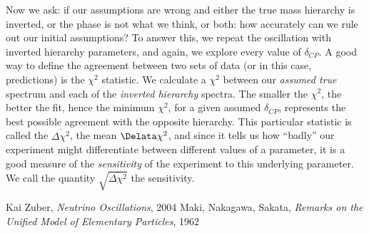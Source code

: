 \documentclass[10pt, a4paper]{article}
\begin{document}
Now we ask: if our assumptions are wrong and either the true mass hierarchy is
inverted, or the phase is not what we think, or both: how accurately can we
rule out our initial assumptions? To answer this, we repeat the oscillation
with inverted hierarchy parameters, and again, we explore every value of
$\delta_{CP}$. A good way to define the agreement between two sets of data (or
in this case, predictions) is the $\chi^2$ statistic. We calculate a $\chi^2$
between our \emph{assumed true} spectrum and each of the \emph{inverted
hierarchy} spectra. The smaller the $\chi^2$, the better the fit, hence the
minimum $\chi^2$, for a given assumed $\delta_{CP}$, represents the best
possible agreement with the opposite hierarchy. This particular statistic is
called the $\overline{\Delta\chi^2}$, the mean $\Delata\chi^2$, and since it tells
us how ``badly'' our experiment might differentiate between different values of
a parameter,  it is a good measure of the \emph{sensitivity} of the experiment
to this underlying parameter.  We call the quantity
$\sqrt{\overline{\Delta\chi^2}}$ the sensitivity.



\begin{thebibliography}{20} 
	 Kai Zuber, \textit{Neutrino
		Oscillations}, 2004
	 Maki, Nakagawa, Sakata, \textit{Remarks on the Unified Model of
		Elementary Particles}, 1962
	
\end{thebibliography}
\end{document}
